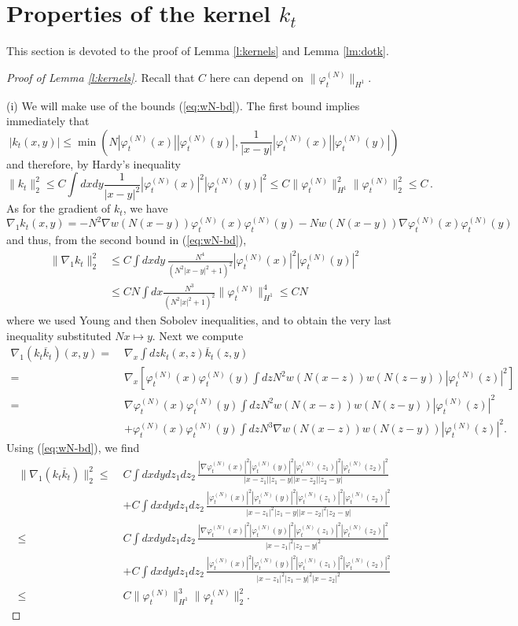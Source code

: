 \documentclass[11pt,a4paper]{article}
\newcommand{\norm}[1]{\lVert#1\rVert}	%
\newcommand{\ph}{\varphi_t^{(N)}}	%
\begin{document}
\section{Properties of the kernel $k_t$}
\label{sec:kernels}


This section is devoted to the proof of Lemma \ref{l:kernels} and Lemma \ref{lm:dotk}.

\begin{proof}[Proof of Lemma \ref{l:kernels}]Recall that $C$ here can depend on $\norm{\ph}_{H^1}$.

(i) We will make use of the bounds (\ref{eq:wN-bd}). The first bound implies immediately that
\begin{equation}\label{eq:k-pt} |k_t (x,y)| \leq \min \left(N |\ph (x)| |\ph (y)| , \frac{1}{|x-y|} |\ph (x)| |\ph (y)| \right) \end{equation}
and therefore, by Hardy's inequality 
\[ \| k_t \|_2^2 \leq C \int dx dy \frac{1}{|x-y|^2} |\ph (x)|^2 |\ph (y)|^2 \leq C \| \ph \|_{H^1}^2 \| \ph \|_2^2  \leq C \, . \]
As for the gradient of $k_t$, we have
\[ \nabla_1 k_t (x,y) = -N^2 \nabla w (N (x-y)) \ph (x) \ph (y) - N w (N (x-y)) \nabla \ph (x) \ph (y) \]
and thus, from the second bound in (\ref{eq:wN-bd}), 
\[ \begin{split} \| \nabla_1 k_t \|_2^2 & \leq C \int dx dy \, \frac{N^4}{(N^2 |x-y|^2 + 1)^2}  |\ph (x)|^2 |\ph (y)|^2  \\ & \leq C N \int dx \frac{N^3}{(N^2 |x|^2 + 1)^2} \| \ph \|_{H^1}^4 \leq C N \end{split} \]
where we used Young and then Sobolev inequalities, and to obtain the very last inequality substituted $Nx \mapsto y$. Next we compute
\[ \begin{split} 
\nabla_1(k_t \overline{k}_t) (x,y) =\; & \nabla_x \int dz k_t (x,z) \overline{k}_t (z,y) \\ 
= \; &\nabla_x \left[  \ph (x) \ph (y) \int dz N^2 w (N(x-z)) w(N(z-y)) |\ph (z)|^2 \right] \\
= \; &\nabla \ph (x) \ph (y) \int dz N^2 w (N(x-z)) w(N(z-y)) |\ph (z)|^2\\ &+ \ph (x) \ph (y) \int dz N^3 \nabla w (N (x-z)) w(N(z-y)) |\ph (z)|^2. \end{split} \] 
Using (\ref{eq:wN-bd}), we find
\[ \begin{split}  \| \nabla_1 (k_t \overline{k}_t) \|_2^2 \leq \; &C \int dx dy dz_1 dz_2 \, \frac{|\nabla \ph (x)|^2 |\ph (y)|^2 |\ph(z_1)|^2 |\ph (z_2)|^2}{|x-z_1||z_1 -y||x-z_2||z_2 -y|} \\
&+C \int dx dy dz_1 dz_2 \, \frac{|\ph (x)|^2 |\ph (y)|^2 |\ph(z_1)|^2 |\ph (z_2)|^2}{|x-z_1|^2 |z_1 -y| |x-z_2|^2 |z_2 -y|} \\  \leq \; &C \int dx dy dz_1 dz_2 \, \frac{|\nabla \ph (x)|^2 |\ph (y)|^2 |\ph(z_1)|^2 |\ph (z_2)|^2}{|x-z_1|^2 |z_2 -y|^2} \\
&+C \int dx dy dz_1 dz_2 \, \frac{|\ph (x)|^2 |\ph (y)|^2 |\ph(z_1)|^2 |\ph (z_2)|^2}{|x-z_1|^2 |z_1 - y|^2 |x-z_2|^2} \\ \leq \; &C \| \ph \|_{H^1}^3 \| \ph \|^2_2. \end{split}\]


\end{proof}
\end{document}
